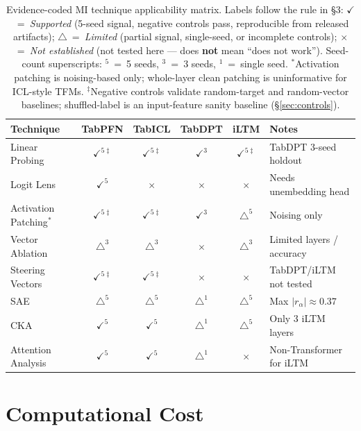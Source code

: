 \documentclass{article}
\begin{document}
\begin{table}[t]
\centering
\caption{Evidence-coded MI technique applicability matrix. Labels follow the rule in \S3: $\checkmark$~=~\textit{Supported} (5-seed signal, negative controls pass, reproducible from released artifacts); $\triangle$~=~\textit{Limited} (partial signal, single-seed, or incomplete controls); $\times$~=~\textit{Not established} (not tested here --- does \textbf{not} mean ``does not work''). Seed-count superscripts: $^{5}$~=~5 seeds, $^{3}$~=~3 seeds, $^{1}$~=~single seed. $^{*}$Activation patching is noising-based only; whole-layer clean patching is uninformative for ICL-style TFMs. $^{\ddagger}$Negative controls validate random-target and random-vector baselines; shuffled-label is an input-feature sanity baseline (\S\ref{sec:controls}).}
\label{tab:applicability-full}
\small
\begin{tabular}{@{}l c c c c >{\raggedright\arraybackslash}p{3.1cm}@{}}
\toprule
Technique & TabPFN & TabICL & TabDPT & iLTM & Notes \\
\midrule
Linear Probing & $\checkmark^{5\ddagger}$ & $\checkmark^{5\ddagger}$ & $\checkmark^{3}$ & $\checkmark^{5\ddagger}$ & TabDPT 3-seed holdout \\
Logit Lens & $\checkmark^{5}$ & $\times$ & $\times$ & $\times$ & Needs unembedding head \\
Activation Patching$^{*}$ & $\checkmark^{5\ddagger}$ & $\checkmark^{5\ddagger}$ & $\checkmark^{3}$ & $\triangle^{5}$ & Noising only \\
Vector Ablation & $\triangle^{3}$ & $\triangle^{3}$ & $\times$ & $\triangle^{3}$ & Limited layers / accuracy \\
Steering Vectors & $\checkmark^{5\ddagger}$ & $\checkmark^{5\ddagger}$ & $\times$ & $\times$ & TabDPT/iLTM not tested \\
SAE & $\triangle^{5}$ & $\triangle^{5}$ & $\triangle^{1}$ & $\triangle^{5}$ & Max $|r_\alpha| \approx 0.37$ \\
CKA & $\checkmark^{5}$ & $\checkmark^{5}$ & $\triangle^{1}$ & $\triangle^{5}$ & Only 3 iLTM layers \\
Attention Analysis & $\checkmark^{5}$ & $\checkmark^{5}$ & $\triangle^{1}$ & $\times$ & Non-Transformer for iLTM \\
\bottomrule
\end{tabular}
\end{table}

\section{Computational Cost}
\label{app:compute}
\end{document}
